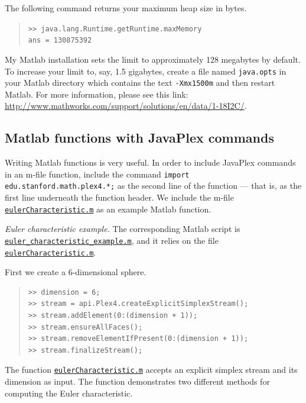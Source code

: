 \documentclass[amscd, amssymb, verbatim]{amsart}[12pt]
\theoremstyle{remark}
\theoremstyle{remark}
\theoremstyle{remark}
\begin{document}
The following command returns your maximum heap size in bytes.
\begin{quote} \texttt{>> java.lang.Runtime.getRuntime.maxMemory\\
ans = 130875392
} \end{quote}
My Matlab installation sets the limit to approximately 128 megabytes by default. To increase your limit to, say, 1.5 gigabytes, create a file named \texttt{java.opts} in your Matlab directory which contains the text \texttt{-Xmx1500m} and then restart Matlab. For more information, please see this link: \url{http://www.mathworks.com/support/solutions/en/data/1-18I2C/}.


\subsection{Matlab functions with JavaPlex commands}\label{matlabFunctions}
Writing Matlab functions is very useful. In order to include JavaPlex commands in an m-file function, include the command \texttt{import edu.stanford.math.plex4.*;} as the second line of the function ---  that is, as the first line underneath the function header. We include the m-file \href{https://github.com/appliedtopology/javaplex/tree/master/src/matlab/for_distribution/tutorial_examples/eulerCharacteristic.m}{\texttt{eulerCharacteristic.m}} as an example Matlab function.

{\em Euler characteristic example.}
The corresponding Matlab script is \href{https://github.com/appliedtopology/javaplex/tree/master/src/matlab/for_distribution/tutorial_examples/euler_characteristic_example.m}{\texttt{euler\_characteristic\_example.m}}, and it relies on the file \href{https://github.com/appliedtopology/javaplex/tree/master/src/matlab/for_distribution/tutorial_examples/eulerCharacteristic.m}{\texttt{eulerCharacteristic.m}}. 

First we create a 6-dimensional sphere. 

\begin{quote} \begin{verbatim}
>> dimension = 6;
>> stream = api.Plex4.createExplicitSimplexStream();
>> stream.addElement(0:(dimension + 1));
>> stream.ensureAllFaces();
>> stream.removeElementIfPresent(0:(dimension + 1));
>> stream.finalizeStream();
\end{verbatim} \end{quote}

The function \href{https://github.com/appliedtopology/javaplex/tree/master/src/matlab/for_distribution/tutorial_examples/eulerCharacteristic.m}{\texttt{eulerCharacteristic.m}} accepts an explicit simplex stream and its dimension as input. The function demonstrates two different methods for computing the Euler characteristic.
\end{document}
